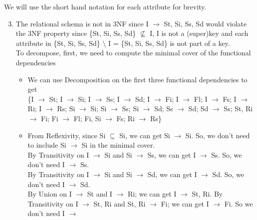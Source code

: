 \documentclass[12pt]{article}
\begin{document}
We will use the short hand notation for each attribute for brevity.
\begin{enumerate}
  \setcounter{enumi}{2}
  \item The relational schema is not in 3NF since I $\longrightarrow$ St, Si,
        Ss, Sd would violate the 3NF property since \{St, Si, Ss, Sd\} $\not
        \subseteq$ I, I is not a (super)key and each attribute in \{St, Si, Ss,
        Sd\} $\setminus$ I = \{St, Si, Ss, Sd\} is not part of a key. \\

        To decompose, first, we need to compute the minimal cover of the
        functional dependencies
        \begin{itemize}
          \item We can use Decomposition on the first three functional
                dependencies to get \\
                \{I $\longrightarrow$ St; I $\longrightarrow$ Si; I
                $\longrightarrow$ Ss; I $\longrightarrow$ Sd; I
                $\longrightarrow$ Fi; I $\longrightarrow$ Fl; I
                $\longrightarrow$ Fs; I $\longrightarrow$ Ri; I
                $\longrightarrow$ Rs; Si $\longrightarrow$ Si; Si
                $\longrightarrow$ Ss; Si $\longrightarrow$ Sd; Ss
                $\longrightarrow$ Sd; Sd $\longrightarrow$ Ss; St, Ri
                $\longrightarrow$ Fi; Fi $\longrightarrow$ Fl; Fi, Si
                $\longrightarrow$ Fs; Ri $\longrightarrow$ Rs\}
          \item From Reflexivity, since Si $\subseteq$ Si, we can get Si
                $\longrightarrow$ Si. So, we don't need to include Si
                $\longrightarrow$ Si in the minimal cover. \\
                By Transitivity on I $\longrightarrow$ Si and Si
                $\longrightarrow$ Ss, we can get I $\longrightarrow$ Ss. So, we
                don't need I $\longrightarrow$ Ss. \\
                By Transitivity on I $\longrightarrow$ Si and Si
                $\longrightarrow$ Sd, we can get I $\longrightarrow$ Sd. So, we
                don't need I $\longrightarrow$ Sd. \\
                By Union on I $\longrightarrow$ St and I $\longrightarrow$ Ri;
                we can get I $\longrightarrow$ St, Ri. By Transitivity on I
                $\longrightarrow$ St, Ri and St, Ri $\longrightarrow$ Fi; we can
                get I $\longrightarrow$ Fi. So we don't need I $\longrightarrow$

\end{itemize}
\end{enumerate}
\end{document}
